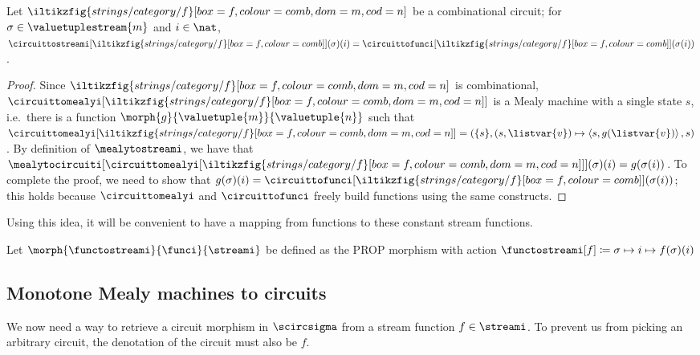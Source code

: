 \documentclass{lmcs}
\begin{document}
\begin{lem}\label{lem:sequential-combinational-semantics}
    Let \(\iltikzfig{strings/category/f}[box=f,colour=comb,dom=m,cod=n]\) be
    a combinational circuit; for \(\sigma \in \valuetuplestream{m}\) and
    \(i \in \nat\), \(
    \circuittostreami[\iltikzfig{strings/category/f}[box=f,colour=comb]](\sigma)(i)
    =
    \circuittofunci[\iltikzfig{strings/category/f}[box=f,colour=comb]](\sigma(i))
    \).
\end{lem}
\begin{proof}
    Since \(\iltikzfig{strings/category/f}[box=f,colour=comb,dom=m,cod=n]\) is
    combinational, \(
    \circuittomealyi[
        \iltikzfig{strings/category/f}[box=f,colour=comb,dom=m,cod=n]
    ]
    \) is a Mealy machine with a single state \(s\), i.e.\ there is a function
    \(\morph{g}{\valuetuple{m}}{\valuetuple{n}}\) such that  \(
    \circuittomealyi[
        \iltikzfig{strings/category/f}[box=f,colour=comb,dom=m,cod=n]
    ] = (
    \{s\},
    (s, \listvar{v}) \mapsto \left\langle{s, g(\listvar{v})}\right\rangle,
    s
    )\).
    By definition of \(\mealytostreami\), we have that \(\mealytocircuiti[
        \circuittomealyi[
            \iltikzfig{strings/category/f}[box=f,colour=comb,dom=m,cod=n]
        ]
    ](\sigma)(i) = g(\sigma(i))\).
    To complete the proof, we need to show that \(
    g(\sigma)(i) =
    \circuittofunci[\iltikzfig{strings/category/f}[box=f,colour=comb]](\sigma(i))
    \); this holds because \(\circuittomealyi\) and \(\circuittofunci\) freely
    build functions using the same constructs.
\end{proof}

Using this idea, it will be convenient to have a mapping from functions to
these constant stream functions.

\begin{defi}
    Let \(\morph{\functostreami}{\funci}{\streami}\) be defined as the PROP
    morphism with action \(
    \functostreami[f] \coloneqq \sigma \mapsto i \mapsto f(\sigma)(i)
    \)
\end{defi}

\subsection{Monotone Mealy machines to circuits}

We now need a way to retrieve a circuit morphism in \(\scircsigma\) from a
stream function \(f \in \streami\).
To prevent us from picking an arbitrary circuit, the denotation of the circuit
must also be \(f\).
\end{document}
